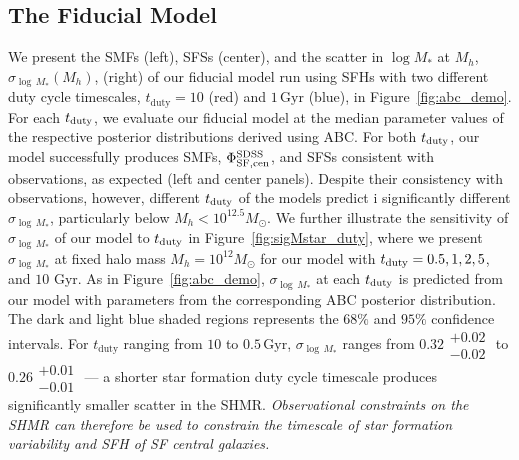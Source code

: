 \documentclass[12pt, letterpaper, preprint, tighten]{aastex62}
\newcommand{\edt}[1]{{\color{dred}{\bf} #1}}
\newcommand{\tduty}{t_{\rm duty}}
\begin{document}
\subsection{\edt{The Fiducial Model}} \label{sec:sfdutycycle}
We present the SMFs (left), SFSs (center), and the scatter in $\log M_*$ at $M_h$,
$\sigma_{\log\,M_*}(M_h)$, (right) of our
\edt{fiducial}
model run using SFHs with two different duty cycle timescales, $t_\mathrm{duty} = 10$ (red)
and $1\,\mathrm{Gyr}$ (blue), in Figure~\ref{fig:abc_demo}. For each $\tduty$,
we evaluate our fiducial model at the median parameter values of the respective
posterior distributions derived using ABC. For both $\tduty$, our model
successfully produces SMFs, $\Phi^{\rm SDSS}_{\rm SF,cen}$, and SFSs consistent
with observations, as expected (left and center panels). Despite their consistency
with observations, however, different $t_{\rm duty}$ of the models predict i
significantly different $\sigma_{\log\,M_*}$, particularly below $M_h < 10^{12.5}M_\odot$.
We further illustrate the sensitivity of $\sigma_{\log\,M_*}$ of our model to
$\tduty$ in Figure~\ref{fig:sigMstar_duty}, where we present $\sigma_{\log\,M_*}$ at
fixed halo mass $M_h = 10^{12} M_\odot$ for our model with $t_{\rm duty} = 0.5, 1, 2, 5$,
and $10$ Gyr. As in Figure~\ref{fig:abc_demo}, $\sigma_{\log\,M_*}$ at each $t_{\rm duty}$
is predicted from our model with parameters from the corresponding ABC posterior
distribution. The dark and light blue shaded regions represents the $68\%$ and $95\%$
confidence intervals. For $t_\mathrm{duty}$ ranging from $10$ to $0.5\,\mathrm{Gyr}$,
$\sigma_{\log\,M_*}$ ranges from
$0.32\substack{+0.02\\ -0.02}$ to $0.26\substack{+0.01\\-0.01}$
--- a shorter star formation duty cycle timescale produces significantly
smaller scatter in the SHMR. \emph{Observational constraints on the SHMR
can therefore be used to constrain the timescale of star formation
variability and SFH of SF central galaxies.}
\end{document}
